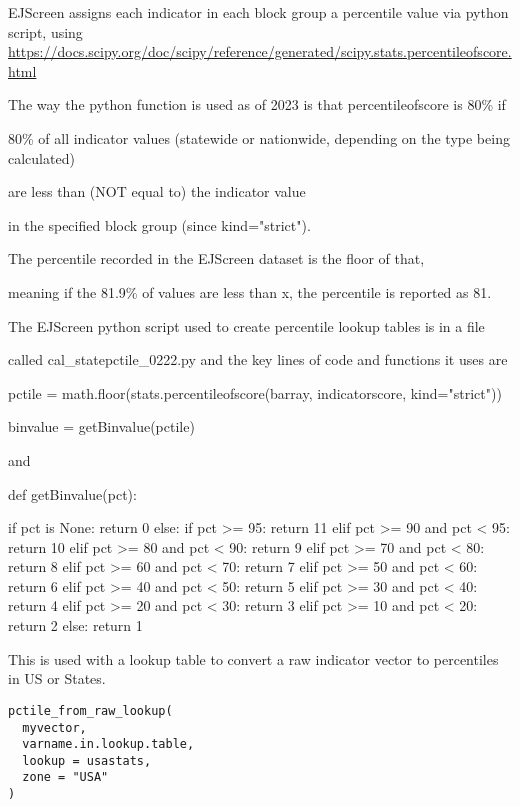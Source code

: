 \documentclass[a4paper]{book}
\begin{document}
\begin{Details}\relax
EJScreen assigns each indicator in each block group a percentile value via python script, using
\url{https://docs.scipy.org/doc/scipy/reference/generated/scipy.stats.percentileofscore.html}

The way the python function is used as of 2023 is that percentileofscore is 80\% if

80\% of all indicator values (statewide or nationwide, depending on the type being calculated)

are less than (NOT equal to) the indicator value

in the specified block group (since kind="strict").

The percentile recorded in the EJScreen dataset is the floor of that,

meaning if the 81.9\% of values are less than x, the percentile is reported as 81.

The EJScreen python script used to create percentile lookup tables is in a file

called cal\_statepctile\_0222.py and the key lines of code and functions it uses are

pctile = math.floor(stats.percentileofscore(barray, indicatorscore, kind="strict"))

binvalue = getBinvalue(pctile)

and

def getBinvalue(pct):

if pct is None:
return 0
else:
if pct >= 95:
return 11
elif pct >= 90 and pct < 95:
return 10
elif pct >= 80 and pct < 90:
return 9
elif pct >= 70 and pct < 80:
return 8
elif pct >= 60 and pct < 70:
return 7
elif pct >= 50 and pct < 60:
return 6
elif pct >= 40 and pct < 50:
return 5
elif pct >= 30 and pct < 40:
return 4
elif pct >= 20 and pct < 30:
return 3
elif pct >= 10 and pct < 20:
return 2
else:
return 1
\end{Details}
%
\begin{Description}\relax
This is used with a lookup table to
convert a raw indicator vector to percentiles in US or States.
\end{Description}
%
\begin{Usage}
\begin{verbatim}
pctile_from_raw_lookup(
  myvector,
  varname.in.lookup.table,
  lookup = usastats,
  zone = "USA"
)
\end{verbatim}
\end{Usage}
\end{document}
